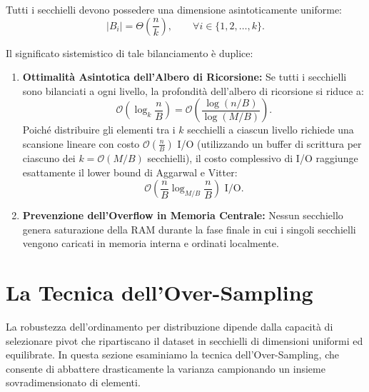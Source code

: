 \begin{property}
Tutti i secchielli devono possedere una dimensione asintoticamente uniforme:
\begin{equation}
  |B_i| = \Theta\left(\frac{n}{k}\right), \qquad \forall i \in \{1, 2, \dots, k\}.
\end{equation}
\end{property}

Il significato sistemistico di tale bilanciamento è duplice:
\begin{enumerate}
  \item \textbf{Ottimalità Asintotica dell'Albero di Ricorsione:} Se tutti i secchielli sono bilanciati a ogni livello, la profondità dell'albero di ricorsione si riduce a:
  \begin{equation}
    \mathcal{O}\left(\log_k \frac{n}{B}\right) = \mathcal{O}\left(\frac{\log(n/B)}{\log(M/B)}\right).
  \end{equation}
  Poiché distribuire gli elementi tra i $k$ secchielli a ciascun livello richiede una scansione lineare con costo $\mathcal{O}\left(\frac{n}{B}\right)$ I/O (utilizzando un buffer di scrittura per ciascuno dei $k = \mathcal{O}(M/B)$ secchielli), il costo complessivo di I/O raggiunge esattamente il lower bound di Aggarwal e Vitter:
  \begin{equation}
    \mathcal{O}\left(\frac{n}{B} \log_{M/B} \frac{n}{B}\right) \text{ I/O}.
  \end{equation}
  \item \textbf{Prevenzione dell'Overflow in Memoria Centrale:} Nessun secchiello genera saturazione della RAM durante la fase finale in cui i singoli secchielli vengono caricati in memoria interna e ordinati localmente.
\end{enumerate}

\FloatBarrier
\section{La Tecnica dell'Over-Sampling}
\label{sec:oversampling-technique}

La robustezza dell'ordinamento per distribuzione dipende dalla capacit\`a di selezionare pivot che ripartiscano il dataset in secchielli di dimensioni uniformi ed equilibrate. In questa sezione esaminiamo la tecnica dell'Over-Sampling, che consente di abbattere drasticamente la varianza campionando un insieme sovradimensionato di elementi.

\FloatBarrier
